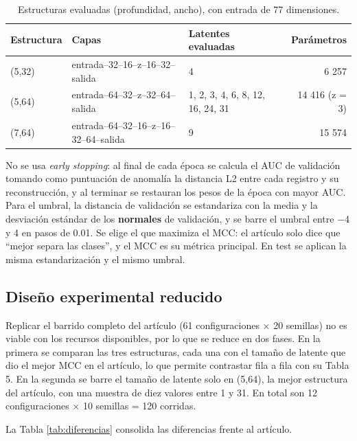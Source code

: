 \documentclass[
  spanish,
  11pt,
]{article}
\begin{document}
\begin{table}[!h]
\centering
\caption{\label{tab:estructuras}Estructuras evaluadas (profundidad, ancho), con entrada de 77 dimensiones.}
\centering
\fontsize{9}{11}\selectfont
\begin{tabular}[t]{lllr}
\toprule
Estructura & Capas & Latentes evaluadas & Parámetros\\
\midrule
(5,32) & entrada–32–16–z–16–32–salida & 4 & 6 257\\
(5,64) & entrada–64–32–z–32–64–salida & 1, 2, 3, 4, 6, 8, 12, 16, 24, 31 & 14 416 (z = 3)\\
(7,64) & entrada–64–32–16–z–16–32–64–salida & 9 & 15 574\\
\bottomrule
\end{tabular}
\end{table}

No se usa \emph{early stopping}: al final de cada época se calcula el AUC de validación tomando como
puntuación de anomalía la distancia L2 entre cada registro y su reconstrucción, y al terminar se
restauran los pesos de la época con mayor AUC. Para el umbral, la distancia de validación se
estandariza con la media y la desviación estándar de los \textbf{normales} de validación, y se barre el
umbral entre −4 y 4 en pasos de 0.01. Se elige el que maximiza el MCC: el artículo solo dice que
``mejor separa las clases'', y el MCC es su métrica principal. En test se aplican la misma
estandarización y el mismo umbral.

\subsection{Diseño experimental reducido}\label{sec:diseno}

Replicar el barrido completo del artículo (61 configuraciones × 20 semillas) no es viable con los
recursos disponibles, por lo que se reduce en dos fases. En la primera se comparan las tres
estructuras, cada una con el tamaño de latente que dio el mejor MCC en el artículo, lo que permite
contrastar fila a fila con su Tabla 5. En la segunda se barre el tamaño de latente solo en (5,64), la
mejor estructura del artículo, con una muestra de diez valores entre 1 y 31. En total son 12
configuraciones × 10 semillas = 120 corridas.

La Tabla \ref{tab:diferencias} consolida las diferencias frente al artículo.
\end{document}
